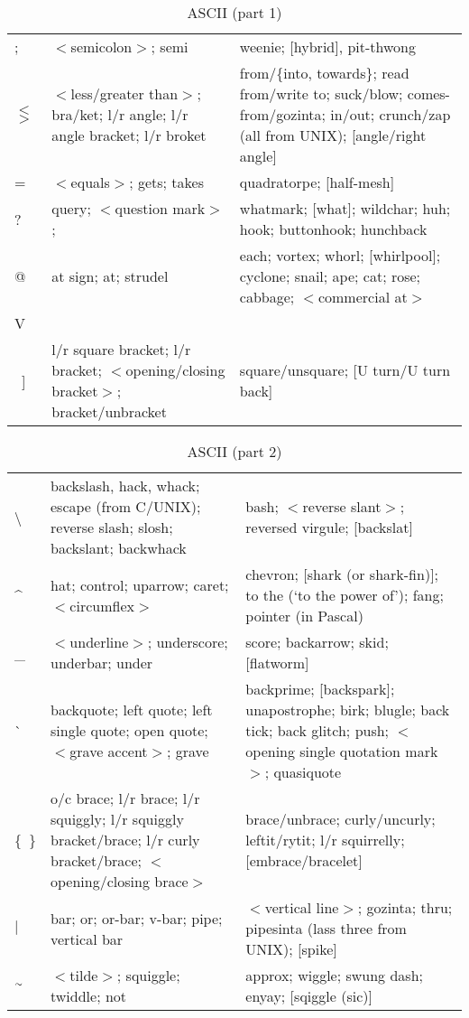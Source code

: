 \begin{table*}
\begin{tabular}{>{\raggedright\arraybackslash}p{1cm}%
			>{\raggedright\arraybackslash}p{}%
			>{\raggedright\arraybackslash}p{}}
		;&$<$semicolon$>$; semi&weenie; [hybrid], pit-thwong\\
		$<$ $>$&$<$less/greater than$>$; bra/ket; l/r angle; l/r angle bracket;
		l/r broket&from/\{into, towards\}; read from/write to; suck/blow;
		comes-from/gozinta; in/out; crunch/zap (all from UNIX); [angle/right
		angle]\\
		=&$<$equals$>$; gets; takes&quadratorpe; [half-mesh]\\
		?&query; $<$question mark$>$; \citeentry{ques}&whatmark; [what];
		wildchar; huh; hook; buttonhook; hunchback\\
		@&at sign; at; strudel&each; vortex; whorl; [whirlpool]; cyclone;
		snail; ape; cat; rose; cabbage; $<$commercial at$>$\\
		V&[book]\\
		{[}\ {]}&l/r square bracket; l/r bracket; $<$opening/closing
		bracket$>$; bracket/unbracket&square/unsquare; [U turn/U turn back]
	\end{tabular}
	\caption{ASCII (part 1)}
\end{table*}

\begin{table*}
	\begin{tabular}{>{\raggedright\arraybackslash}p{1cm}%
			>{\raggedright\arraybackslash}p{(\textwidth-6\tabcolsep-1cm)/2}%
			>{\raggedright\arraybackslash}p{}}
		\textbackslash&backslash, hack, whack; escape (from C/UNIX); reverse
		slash; slosh; backslant; backwhack&bash; $<$reverse slant$>$; reversed
		virgule; [backslat]\\
		\^{}&hat; control; uparrow; caret; $<$circumflex$>$&chevron; [shark (or
		shark-fin)]; to the (`to the power of'); fang; pointer (in Pascal)\\
		\_&$<$underline$>$; underscore; underbar; under&score; backarrow; skid;
		[flatworm]\\
		\`{}&backquote; left quote; left single quote; open quote; $<$grave
		accent$>$; grave&backprime; [backspark]; unapostrophe; birk; blugle;
		back tick; back glitch; push; $<$opening single quotation mark$>$;
		quasiquote\\
		\{\ \}&o/c brace; l/r brace; l/r squiggly; l/r squiggly bracket/brace;
		l/r curly bracket/brace; $<$opening/closing brace$>$&brace/unbrace;
		curly/uncurly; leftit/rytit; l/r squirrelly; [embrace/bracelet]\\
		$\left|\right.$&bar; or; or-bar; v-bar; pipe; vertical bar&$<$vertical
		line$>$; gozinta; thru; pipesinta (lass three from UNIX); [spike]\\
		$\Tilde$&$<$tilde$>$; squiggle; twiddle; not&approx; wiggle; swung
		dash; enyay; [sqiggle (sic)]\\
		\bottomrule
	\end{tabular}
	\caption{ASCII (part 2)}
\end{table*}

